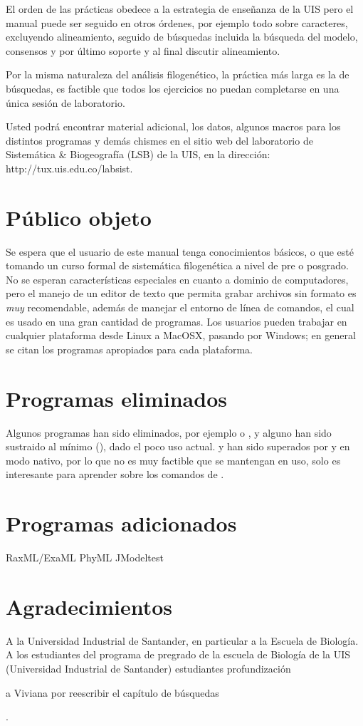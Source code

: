 El orden de las pr\'acticas obedece a la estrategia de ense\~nanza de la UIS pero  el manual puede ser seguido en otros \'ordenes, por ejemplo todo sobre caracteres, excluyendo alineamiento, seguido de b\'usquedas incluida la b\'usqueda del modelo, consensos y por \'ultimo soporte y al final discutir alineamiento.

Por la misma naturaleza del an\'alisis filogen\'etico, la pr\'actica m\'as larga es la de b\'usquedas, es factible que todos los ejercicios no puedan completarse en una \'unica sesi\'on de laboratorio.

Usted podr\'a encontrar material adicional, los datos, algunos macros para los distintos programas y dem\'as chismes en el sitio web del laboratorio de Sistem\'atica \& Biogeograf\'ia (LSB) de la UIS, en la direcci\'on: http://tux.uis.edu.co/labsist.
\section*{P\'ublico objeto}
Se espera que el usuario de este manual tenga conocimientos b\'asicos, o que est\'e tomando un curso formal de sistem\'atica filogen\'etica a nivel de pre o posgrado. No se esperan caracter\'isticas especiales en cuanto a dominio de computadores, pero el manejo de un editor de texto que permita grabar archivos sin formato es \emph{muy} recomendable, adem\'as de manejar el entorno de l\'inea de comandos, el cual es usado en una gran cantidad de programas. Los usuarios pueden trabajar en cualquier plataforma desde Linux a 
MacOSX, pasando por Windows; en general se citan los programas apropiados para cada plataforma.

\section*{Programas eliminados}
Algunos programas han sido eliminados, por ejemplo  o , y alguno han sido sustraido al m\'inimo (), dado el poco uso actual.  y  han sido superados por  y  en modo nativo, por lo que no es muy factible que se mantengan en uso, solo  es interesante para aprender sobre los comandos de .


\section*{Programas adicionados}
RaxML/ExaML
PhyML
JModeltest



\section*{Agradecimientos}
A la Universidad Industrial de Santander, en particular a la Escuela de Biolog\'ia. A los estudiantes del programa de pregrado de la escuela de Biolog\'ia de la UIS (Universidad Industrial de Santander) 
estudiantes profundizaci\'on

a Viviana por reescribir el cap\'itulo de b\'usquedas



.